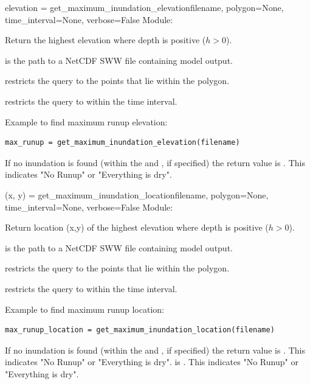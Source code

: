 \documentclass{manual}
\begin{document}
\begin{funcdesc}{elevation = get_maximum_inundation_elevation}{filename,
                                     polygon=None,
                                     time_interval=None,
                                     verbose=False}
Module: 

Return the highest elevation where depth is positive ($h > 0$).

 is the path to a NetCDF SWW file containing \anuga model output.

 restricts the query to the points that lie within the polygon.

 restricts the query to within the time interval.

Example to find maximum runup elevation:

\begin{verbatim}
max_runup = get_maximum_inundation_elevation(filename)
\end{verbatim}

If no inundation is found (within the  and , if specified)
the return value is . This indicates "No Runup" or "Everything is dry".
\end{funcdesc}

\begin{funcdesc}{(x, y) = get_maximum_inundation_location}{filename,
                                    polygon=None,
                                    time_interval=None,
                                    verbose=False}
Module: 

Return location (x,y) of the highest elevation where depth is positive ($h > 0$).

 is the path to a NetCDF SWW file containing \anuga model output.

 restricts the query to the points that lie within the polygon.

 restricts the query to within the time interval.

Example to find maximum runup location:

\begin{verbatim}
max_runup_location = get_maximum_inundation_location(filename)
\end{verbatim}

If no inundation is found (within the  and , if specified)
the return value is . This indicates "No Runup" or "Everything is dry".
is . This indicates "No Runup" or "Everything is dry".
\end{funcdesc}
\end{document}
